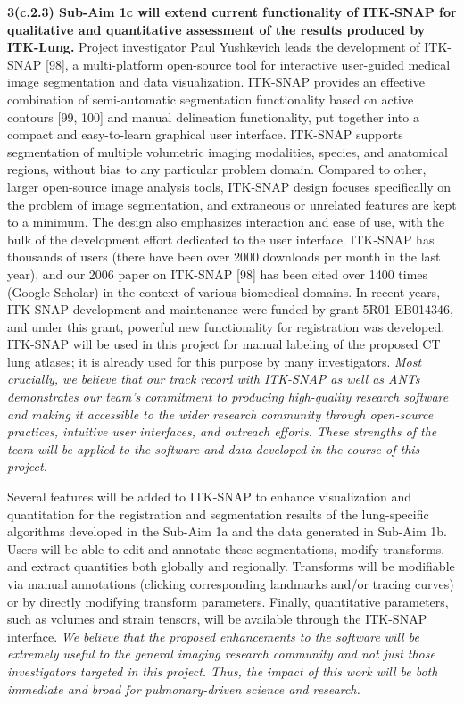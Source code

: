 \documentclass[11pt,]{article}
\begin{document}
\textbf{3(c.2.3) Sub-Aim 1c will extend current functionality of
ITK-SNAP for qualitative and quantitative assessment of the results
produced by ITK-Lung.} Project investigator Paul Yushkevich leads the
development of ITK-SNAP {[}98{]}, a multi-platform open-source tool for
interactive user-guided medical image segmentation and data
visualization. ITK-SNAP provides an effective combination of
semi-automatic segmentation functionality based on active contours
{[}99, 100{]} and manual delineation functionality, put together into a
compact and easy-to-learn graphical user interface. ITK-SNAP supports
segmentation of multiple volumetric imaging modalities, species, and
anatomical regions, without bias to any particular problem domain.
Compared to other, larger open-source image analysis tools, ITK-SNAP
design focuses specifically on the problem of image segmentation, and
extraneous or unrelated features are kept to a minimum. The design also
emphasizes interaction and ease of use, with the bulk of the development
effort dedicated to the user interface. ITK-SNAP has thousands of users
(there have been over 2000 downloads per month in the last year), and
our 2006 paper on ITK-SNAP {[}98{]} has been cited over 1400 times
(Google Scholar) in the context of various biomedical domains. In recent
years, ITK-SNAP development and maintenance were funded by grant 5R01
EB014346, and under this grant, powerful new functionality for
registration was developed. ITK-SNAP will be used in this project for
manual labeling of the proposed CT lung atlases; it is already used for
this purpose by many investigators. \emph{Most crucially, we believe
that our track record with ITK-SNAP as well as ANTs demonstrates our
team's commitment to producing high-quality research software and making
it accessible to the wider research community through open-source
practices, intuitive user interfaces, and outreach efforts. These
strengths of the team will be applied to the software and data developed
in the course of this project.}

Several features will be added to ITK-SNAP to enhance visualization and
quantitation for the registration and segmentation results of the
lung-specific algorithms developed in the Sub-Aim 1a and the data
generated in Sub-Aim 1b. Users will be able to edit and annotate these
segmentations, modify transforms, and extract quantities both globally
and regionally. Transforms will be modifiable via manual annotations
(clicking corresponding landmarks and/or tracing curves) or by directly
modifying transform parameters. Finally, quantitative parameters, such
as volumes and strain tensors, will be available through the ITK-SNAP
interface. \emph{We believe that the proposed enhancements to the
software will be extremely useful to the general imaging research
community and not just those investigators targeted in this project.
Thus, the impact of this work will be both immediate and broad for
pulmonary-driven science and research.}
\end{document}

